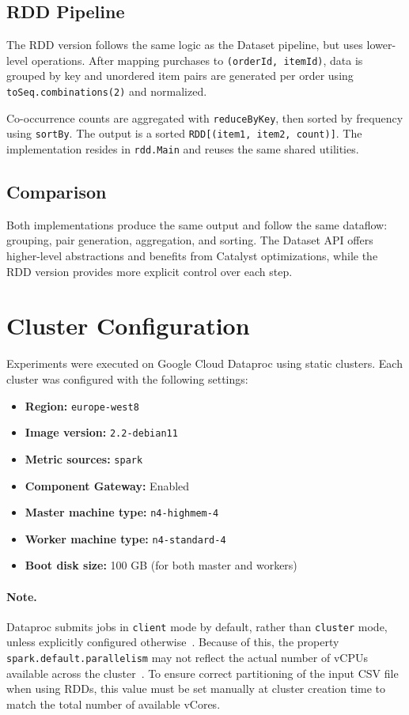 \documentclass[sigconf,nonacm]{acmart}
\begin{document}
\subsection{RDD Pipeline}
The RDD version follows the same logic as the Dataset pipeline, but uses lower-level operations. After mapping purchases to \texttt{(orderId, itemId)}, data is grouped by key and unordered item pairs are generated per order using \texttt{toSeq.combinations(2)} and normalized.

Co-occurrence counts are aggregated with \texttt{reduceByKey}, then sorted by frequency using \texttt{sortBy}. The output is a sorted \texttt{RDD[(item1, item2, count)]}. The implementation resides in \texttt{rdd.Main} and reuses the same shared utilities.

\subsection{Comparison}
Both implementations produce the same output and follow the same dataflow: grouping, pair generation, aggregation, and sorting. The Dataset API offers higher-level abstractions and benefits from Catalyst optimizations, while the RDD version provides more explicit control over each step.

\section{Cluster Configuration}

Experiments were executed on Google Cloud Dataproc using static clusters. Each cluster was configured with the following settings:

\begin{itemize}
  \item \textbf{Region:} \texttt{europe-west8}
  \item \textbf{Image version:} \texttt{2.2-debian11}
  \item \textbf{Metric sources:} \texttt{spark}
  \item \textbf{Component Gateway:} Enabled
  \item \textbf{Master machine type:} \texttt{n4-highmem-4}
  \item \textbf{Worker machine type:} \texttt{n4-standard-4}
  \item \textbf{Boot disk size:} 100 GB (for both master and workers)
\end{itemize}

\paragraph*{Note.}
Dataproc submits jobs in \texttt{client} mode by default, rather than \texttt{cluster} mode, unless explicitly configured otherwise~\cite{dataproc-output}. 
Because of this, the property \texttt{spark.default.parallelism} may not reflect the actual number of vCPUs available across the cluster~\cite{spark-config}. 
To ensure correct partitioning of the input CSV file when using RDDs, this value must be set manually at cluster creation time to match the total number of available vCores.
\end{document}
